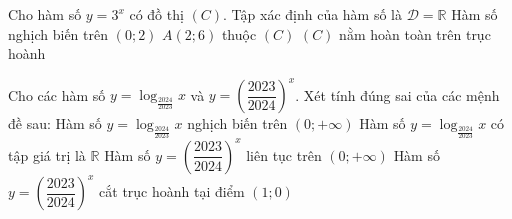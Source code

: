 \begin{ex}%
 Cho hàm số  $y=3^x$ có đồ thị $(C)$.
 \choiceTF 
  {\True Tập xác định của  hàm số là $\mathscr{D} = \mathbb{R}$}
   {Hàm số nghịch biến trên $(0;2)$}
  {$A(2;6)$ thuộc $(C)$} 
  {\True  $(C)$ nằm hoàn toàn trên trục hoành}
\end{ex}

\begin{ex}%
 Cho các hàm  số $y=\log_{\frac{2024}{2023}} x$ và $y=\left(\dfrac{2023}{2024}\right)^x$. Xét tính đúng sai của các mệnh đề sau:
 \choiceTF 
  {Hàm số $y=\log_{\frac{20 24}{2023}} x$ nghịch  biến trên $(0;+\infty)$}
  {\True Hàm số $y=\log_{\frac{2024}{2023}} x$ có tập giá  trị là $\mathbb{R}$}
  {\True Hàm  số $y=\left(\dfrac{2023}{2024}\right)^x$ liên tục trên $(0;+\infty)$}
   {Hàm số $y=\left(\dfrac{2023}{2024}\right)^x$ cắt trục hoành tại điểm $(1;0)$}
\end{ex}

